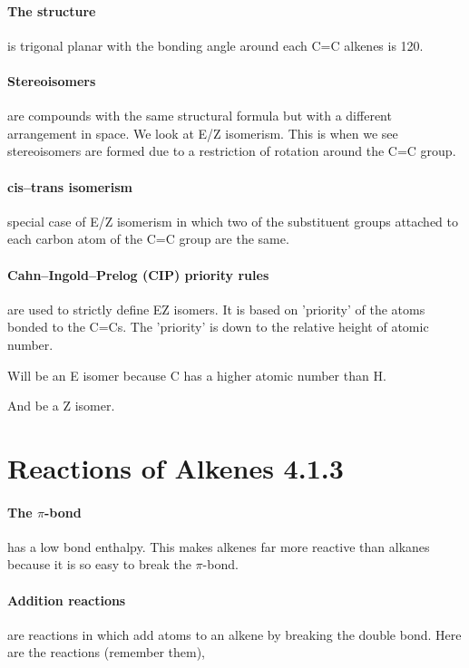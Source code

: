 	\paragraph{The structure} is trigonal planar with the bonding angle around each C=C alkenes is 120\degree .
	
	\paragraph{Stereoisomers} are compounds with the same structural formula but with a different arrangement in space.
	We look at E/Z isomerism.
	This is when we see stereoisomers are formed due to a restriction of rotation around the C=C group.
	
	\paragraph{cis–trans isomerism} special case of E/Z isomerism in which two of the substituent groups attached to each carbon atom of the C=C group are the same.
	
	\paragraph{Cahn–Ingold–Prelog (CIP) priority rules} are used to strictly define EZ isomers.
	It is based on 'priority' of the atoms bonded to the C=Cs. The 'priority' is down to the relative height of atomic number.
	\begin{center}
	\end{center}
	Will be an E isomer because C has a higher atomic number than H.
	\begin{center}
	\end{center}
	And be a Z isomer.
	
\section{Reactions of Alkenes 4.1.3}

	\paragraph{The $\pi$-bond} has a low bond enthalpy.
	This makes alkenes far more reactive than alkanes because it is so easy to break the $\pi$-bond.
	
	\paragraph{Addition reactions} are reactions in which add atoms to an alkene by breaking the double bond. Here are the reactions (remember them),
	
